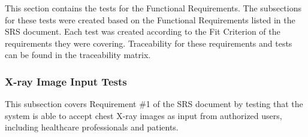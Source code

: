 \documentclass[12pt, titlepage]{article}
\begin{document}
This section contains the tests for the Functional Requirements. The subsections for these tests were created based on the Functional Requirements listed in the SRS document. Each test was created according to the Fit Criterion of the requirements they were covering. Traceability for these requirements and tests can be found in the traceability matrix.

\subsubsection{X-ray Image Input Tests}

This subsection covers Requirement \#1 of the SRS document by testing that the system is able to accept chest X-ray images as input from authorized users, including healthcare professionals and patients.
\end{document}

